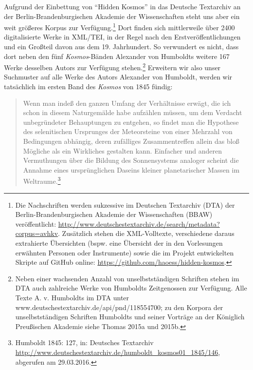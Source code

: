 \documentclass[a4paper,
fontsize=11pt,
oneside,
numbers=noperiodatend,
parskip=half-,
bibliography=totoc,
final
]{scrartcl}
\begin{document}
Aufgrund der Einbettung von \enquote{Hidden Kosmos} in das Deutsche
Textarchiv an der Berlin-Brandenburgischen Akademie der Wissenschaften
steht uns aber ein weit größeres Korpus zur Verfügung.\footnote{Die
  Nachschriften werden sukzessive im Deutschen Textarchiv (DTA) der
  Berlin-Brandenburgischen Akademie der Wissenschaften (BBAW)
  veröffentlicht:
  \url{http://www.deutschestextarchiv.de/search/metadata?corpus=avhkv}.
  Zusätzlich stehen die XML-Volltexte, verschiedene daraus extrahierte
  Übersichten (bspw. eine Übersicht der in den Vorlesungen erwähnten
  Personen oder Instrumente) sowie die im Projekt entwickelten Skripte
  auf GitHub online: \url{https://github.com/haoess/hidden-kosmos}.}
Dort finden sich mittlerweile über 2400 digitalisierte Werke in XML/TEI,
in der Regel nach den Erstveröffentlichungen und ein Großteil davon aus
dem 19. Jahrhundert. So verwundert es nicht, dass dort neben den fünf
\emph{Kosmos}-Bänden Alexander von Humboldts weitere 167 Werke desselben
Autors zur Verfügung stehen.\footnote{Neben einer wachsenden Anzahl von
  unselbstständigen Schriften stehen im DTA auch zahlreiche Werke von
  Humboldts Zeitgenossen zur Verfügung. Alle Texte A. v. Humboldts im
  DTA unter www.deutschestextarchiv.de/api/pnd/118554700; zu den Korpora
  der unselbstständigen Schriften Humboldts und seiner Vorträge an der
  Königlich Preußischen Akademie siehe Thomas 2015a und 2015b.}
Erweitern wir also unser Suchmuster auf alle Werke des Autors Alexander
von Humboldt, werden wir tatsächlich im ersten Band des \emph{Kosmos}
von 1845 fündig:

\begin{quote}
Wenn man indeß den ganzen Umfang der Verhältnisse erwägt, die ich schon
in diesem Naturgemälde habe aufzählen müssen, um dem Verdacht
unbegründeter Behauptungen zu entgehen, so findet man die Hypothese des
selenitischen Ursprunges der Meteorsteine von einer Mehrzahl von
Bedingungen abhängig, deren zufälliges Zusammentreffen allein das bloß
Mögliche als ein Wirkliches gestalten kann. Einfacher und anderen
Vermuthungen über die Bildung des Sonnensystems analoger scheint die
Annahme eines ursprünglichen Daseins kleiner planetarischer Massen im
Weltraume.\footnote{Humboldt 1845: 127, in: Deutsches Textarchiv
  \url{http://www.deutschestextarchiv.de/humboldt_kosmos01_1845/146},
  abgerufen am 29.03.2016.}
\end{quote}
\end{document}
